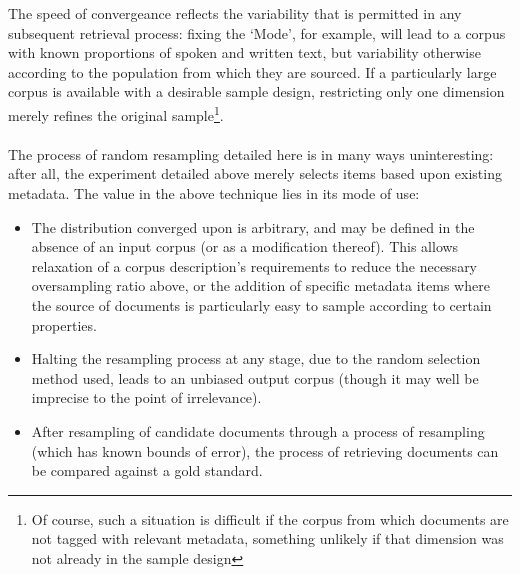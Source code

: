 The speed of convergeance reflects the variability that is permitted in any subsequent retrieval process: fixing the `Mode', for example, will lead to a corpus with known proportions of spoken and written text, but variability otherwise according to the population from which they are sourced.  If a particularly large corpus is available with a desirable sample design, restricting only one dimension merely refines the original sample\footnote{Of course, such a situation is difficult if the corpus from which documents are not tagged with relevant metadata, something unlikely if that dimension was not already in the sample design}.

\paragraph{}

The process of random resampling detailed here is in many ways uninteresting: after all, the experiment detailed above merely selects items based upon existing metadata.  The value in the above technique lies in its mode of use:

\begin{itemize}
    \item The distribution converged upon is arbitrary, and may be defined in the absence of an input corpus (or as a modification thereof).  This allows relaxation of a corpus description's requirements to reduce the necessary oversampling ratio above, or the addition of specific metadata items where the source of documents is particularly easy to sample according to certain properties.
    \item Halting the resampling process at any stage, due to the random selection method used, leads to an unbiased output corpus (though it may well be imprecise to the point of irrelevance).
    \item After resampling of candidate documents through a process of resampling (which has known bounds of error), the process of retrieving documents can be compared against a gold standard.
\end{itemize}
















